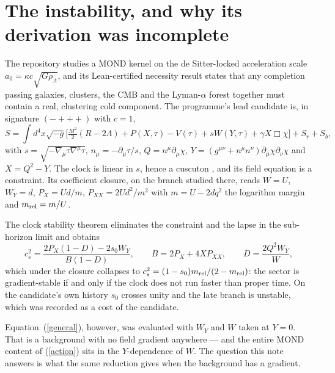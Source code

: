 \documentclass[11pt,letterpaper]{article}
\begin{document}
\section{The instability, and why its derivation was incomplete}
The repository \cite{repo} studies a MOND kernel on the de Sitter-locked acceleration scale $a_0=\kappa c\sqrt{G\rho_\Lambda}$, and its Lean-certified necessity result states that any completion passing galaxies, clusters, the CMB and the Lyman-$\alpha$ forest together must contain a real, clustering cold component. The programme's lead candidate \cite{paper13} is, in signature $(-{+}{+}{+})$ with $c=1$,
\begin{equation}
S=\int d^4x\sqrt{-g}\Big[\tfrac{M^2}{2}(R-2\Lambda)+P(X,\tau)-V(\tau)+sW(Y,\tau)+\gamma X\Box\chi\Big]+S_r+S_b,
\label{action}
\end{equation}
with $s=\sqrt{-\nabla_\mu\tau\nabla^\mu\tau}$, $n_\mu=-\partial_\mu\tau/s$, $Q=n^\mu\partial_\mu\chi$, $Y=(g^{\mu\nu}+n^\mu n^\nu)\partial_\mu\chi\partial_\nu\chi$ and $X=Q^2-Y$. The clock is linear in $s$, hence a cuscuton \cite{cuscuton}, and its field equation is a constraint. Its coefficient closure, on the branch studied there, reads $W=U$, $W_Y=d$, $P_X=Ud/m$, $P_{XX}=2Ud^2/m^2$ with $m=U-2dq^2$ the logarithm margin and $m_{\rm rel}=m/U$.

The clock stability theorem \cite{paper17} eliminates the constraint and the lapse in the sub-horizon limit and obtains
\begin{equation}
c_s^2=\frac{2P_X(1-D)-2s_0W_Y}{B(1-D)},\qquad B=2P_X+4XP_{XX},\qquad D=\frac{2Q^2W_Y}{W},
\label{general}
\end{equation}
which under the closure collapses to $c_s^2=(1-s_0)m_{\rm rel}/(2-m_{\rm rel})$: the sector is gradient-stable if and only if the clock does not run faster than proper time. On the candidate's own history $s_0$ crosses unity and the late branch is unstable, which was recorded as a cost of the candidate.

Equation~(\ref{general}), however, was evaluated with $W_Y$ and $W$ taken at $Y=0$. That is a background with no field gradient anywhere --- and the entire MOND content of (\ref{action}) sits in the $Y$-dependence of $W$. The question this note answers is what the same reduction gives when the background has a gradient.
\end{document}
